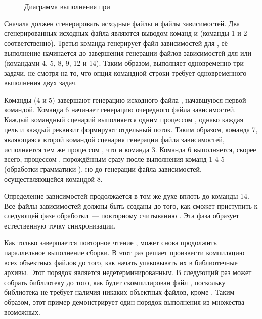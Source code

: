 \begin{figure}
\begin{center}
\end{center}
\caption{Диаграмма выполнения \GNUmake{} при }
\label{fig:parallel_make}
\end{figure}

Сначала \GNUmake{} должен сгенерировать исходные файлы и файлы
зависимостей. Два сгенерированных исходных файла являются выводом
команд  и  (команды 1 и 2
соответственно). Третья команда генерирует файл зависимостей для
, её выполнение начинается до завершения
генерации файлов зависимостей для  или
 (командами 4, 5, 8, 9, 12 и 14). Таким образом,
\GNUmake{} выполняет одновременно три задачи, не смотря на то, что
опция командной строки требует одновременного выполнения двух задач.

Команды  (4 и 5) завершают генерацию исходного файла
, начавшуюся первой командой. Команда 6 начинает
генерацию очередного файла зависимостей. Каждый командный сценарий
выполняется одним процессом \GNUmake{}, однако каждая цель и каждый
реквизит формируют отдельный поток. Таким образом, команда 7,
являющаяся второй командой сценария генерации файла зависимостей,
исполняется тем же процессом \GNUmake{}, что и команда 3. Команда 6
выполняется, скорее всего, процессом \GNUmake{}, порождённым сразу
после выполнения команд 1-4-5 (обработки грамматики ),
но до генерации файла зависимостей, осуществляющейся командой 8.

Определение зависимостей продолжается в том же духе вплоть до команды
14. Все файлы зависимостей должны быть созданы до того, как \GNUmake{}
сможет приступить к следующей фазе обработки~--- повторному считыванию
. Эта фаза образует естественную точку синхронизации.

Как только завершается повторное чтение , \GNUmake{} может
снова продолжить параллельное выполнение сборки. В этот раз \GNUmake{}
решает произвести компиляцию всех объектных файлов до того, как начать
упаковывать их в библиотечные архивы. Этот порядок является
недетерминированным. В следующий раз \GNUmake{} может собрать
библиотеку  до того, как будет скомпилирован файл
, поскольку библиотека не требует наличия никаких
объектных файлов, кроме . Таким образом, этот пример
демонстрирует один порядок выполнения из множества возможных.

